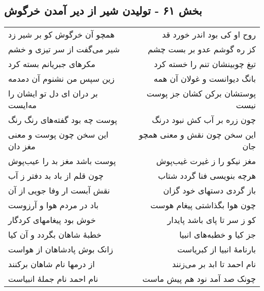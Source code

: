 \begin{center}
\section*{بخش ۶۱ - تولیدن شیر از دیر آمدن خرگوش}
\label{sec:sh061}
\begin{longtable}{l p{0.5cm} r}
همچو آن خرگوش کو بر شیر زد
&&
روح او کی بود اندر خورد قد
\\
شیر می‌گفت از سر تیزی و خشم
&&
کز ره گوشم عدو بر بست چشم
\\
مکرهای جبریانم بسته کرد
&&
تیغ چوبینشان تنم را خسته کرد
\\
زین سپس من نشنوم آن دمدمه
&&
بانگ دیوانست و غولان آن همه
\\
بر دران ای دل تو ایشان را مه‌ایست
&&
پوستشان برکن کشان جز پوست نیست
\\
پوست چه بود گفته‌های رنگ رنگ
&&
چون زره بر آب کش نبود درنگ
\\
این سخن چون پوست و معنی مغز دان
&&
این سخن چون نقش و معنی همچو جان
\\
پوست باشد مغز بد را عیب‌پوش
&&
مغز نیکو را ز غیرت غیب‌پوش
\\
چون قلم از باد بد دفتر ز آب
&&
هرچه بنویسی فنا گردد شتاب
\\
نقش آبست ار وفا جویی از آن
&&
باز گردی دستهای خود گزان
\\
باد در مردم هوا و آرزوست
&&
چون هوا بگذاشتی پیغام هوست
\\
خوش بود پیغامهای کردگار
&&
کو ز سر تا پای باشد پایدار
\\
خطبهٔ شاهان بگردد و آن کیا
&&
جز کیا و خطبه‌های انبیا
\\
زانک بوش پادشاهان از هواست
&&
بارنامهٔ انبیا از کبریاست
\\
از درمها نام شاهان برکنند
&&
نام احمد تا ابد بر می‌زنند
\\
نام احمد نام جملهٔ انبیاست
&&
چونک صد آمد نود هم پیش ماست
\\
\end{longtable}
\end{center}
